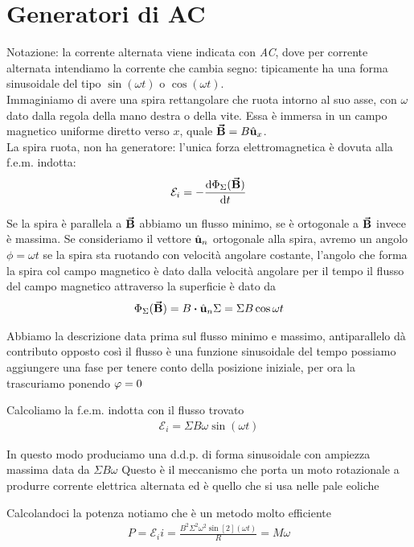 \section{Generatori di AC}
Notazione: la corrente alternata viene indicata con \textit{AC}, dove per corrente alternata intendiamo la corrente che cambia segno: tipicamente ha una forma sinusoidale del tipo $\sin(\omega t)$ o $\cos(\omega t)$.\\
Immaginiamo di avere una spira rettangolare che ruota intorno al suo asse, con $\omega$ dato dalla regola della mano destra o della vite. Essa è immersa in un campo magnetico uniforme diretto verso $x$, quale $\vb*{\va{B}}=B\hat{\mathbf{u}}_x$.\\
La spira ruota, non ha generatore: l'unica forza elettromagnetica è dovuta alla f.e.m. indotta:
\begin{gather*}
	\mathcal{E}_i=-\dv{\Phi_\Sigma(\vb*{\va{B}})}{t}
\end{gather*}

Se la spira è parallela a $\vb*{\va{B}}$ abbiamo un flusso minimo, se è ortogonale a $\vb*{\va{B}}$ invece è massima.
Se consideriamo il vettore $\hat{\mathbf{u}}_n$ ortogonale alla spira, avremo un angolo $\phi=\omega t$
se la spira sta ruotando con velocità angolare costante, l'angolo che forma la spira col campo magnetico è dato dalla velocità angolare per il tempo
il flusso del campo magnetico attraverso la superficie è dato da
\begin{gather*}
	\Phi_\Sigma(\vba B)=B\vdot\vbh u_n\Sigma=\Sigma B\cos\omega t
\end{gather*}

Abbiamo la descrizione data prima  sul flusso minimo e massimo, antiparallelo dà contributo opposto
così il flusso è una funzione sinusoidale del tempo
possiamo aggiungere una fase per tenere conto della posizione iniziale, per ora la trascuriamo ponendo $\oldphi=0$

Calcoliamo la f.e.m. indotta con il flusso trovato
\begin{gather*}
	\mathcal{E}_i=\Sigma B\omega\sin(\omega t)
\end{gather*}

In questo modo produciamo una d.d.p. di forma sinusoidale con ampiezza massima data da $\Sigma B\omega$
Questo è il meccanismo che porta un moto rotazionale a produrre corrente elettrica alternata ed è quello che si usa nelle pale eoliche

Calcolandoci la potenza notiamo che è un metodo molto efficiente
\begin{gather*}
	P=\mathcal{E}_ii=\frac{B^2\Sigma^2\omega^2\sin[2](\omega t)}{R}=M\omega
\end{gather*}

